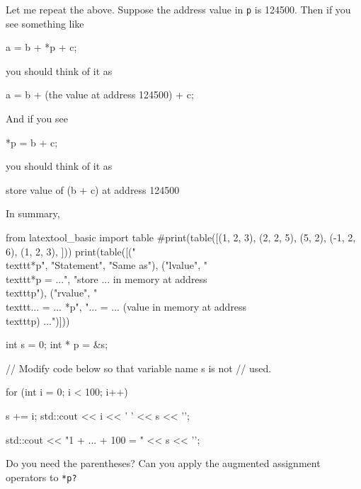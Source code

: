 
Let me repeat the above. Suppose the address value in \texttt{p} is 124500. Then if you see something like

\begin{consolethree}[escapeinside=||]
a = b + *p + c;
\end{consolethree}

you should think of it as

\begin{consolethree}[escapeinside=||]
a = b + (the value at address 124500) + c;
\end{consolethree}

And if you see

\begin{consolethree}[escapeinside=||]
*p = b + c;
\end{consolethree}

you should think of it as

\begin{consolethree}[escapeinside=||]
store value of (b + c) at address 124500
\end{consolethree}

In summary,
\begin{python}
from latextool_basic import table
#print(table([(1, 2, 3), (2, 2, 5), (5, 2), (-1, 2, 6), (1, 2, 3), ]))
print(table([("\\texttt{*p}", "Statement", "Same as"), ("lvalue", "\\texttt{*p = ...}", "store ... in memory at address \\texttt{p}"), ("rvalue", "\\texttt{... = ... *p}", "... = ... (value in memory at address \\texttt{p}) ...")]))
\end{python}












\begin{consolethree}[escapeinside=||]
int s = 0;
int * p = &s;

// Modify code below so that variable name s is not
// used.

for (int i = 0; i < 100; i++)

{   
    s += i;
    std::cout << i << ' ' << s << '\n';
}

std::cout << "1 + ... + 100 = " << s << '\n';
\end{consolethree}




Do you need the parentheses? Can you apply the augmented assignment operators to \texttt{*p?}

